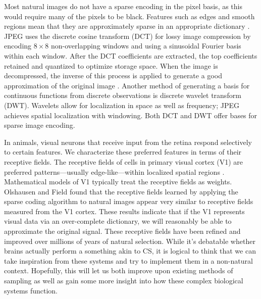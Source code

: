 \documentclass{article}
\begin{document}
Most natural images do not have a sparse encoding in the pixel basis, as this would require many of the pixels to be black.
Features such as edges and smooth regions mean that they are approximately sparse in an appropriate dictionary \cite{mallat}.
JPEG uses the discrete cosine transform (DCT) for lossy image compression by encoding $8 \times 8$ non-overlapping windows and using a sinusoidal Fourier basis within each window.
After the DCT coefficients are extracted, the top coefficients retained and quantized to optimize storage space.
When the image is decompressed, the inverse of this process is applied to generate a good approximation of the original image \cite{wallaceJPEGStillPicture1992}.
Another method of generating a basis for continuous functions from discrete observations is discrete wavelet transform (DWT).
Wavelets allow for localization in space as well as frequency;
JPEG achieves spatial localization with windowing.
Both DCT and DWT offer bases for sparse image encoding.

In animals, visual neurons that receive input from the retina respond selectively to certain features.
We characterize these preferred features in terms of their receptive fields.
The receptive fields of cells in primary visual cortex (V1) are preferred patterns---usually edge-like---within localized spatial regions \cite{hubelReceptiveFieldsBinocular1962}.
Mathematical models of V1 typically treat the receptive fields as weights.
Olshausen and Field \cite{olshausenSparseCodingOvercomplete1997} found that the receptive fields learned by applying the sparse coding algorithm to natural images appear very similar to receptive fields measured from the V1 cortex.
These results indicate that if the V1 represents visual data via an over-complete dictionary, we will reasonably be able to approximate the original signal.
These receptive fields have been refined and improved over millions of years of natural selection.
While it's debatable whether brains actually perform a something akin to CS, it is logical to think that we can take inspiration from these systems and try to implement them in a non-natural context.
Hopefully, this will let us both improve upon existing methods of sampling as well as gain some more insight into how these complex biological systems function.
\end{document}
